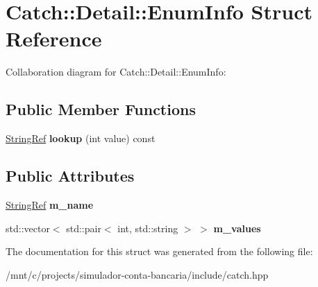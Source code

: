 \hypertarget{structCatch_1_1Detail_1_1EnumInfo}{}\section{Catch\+:\+:Detail\+:\+:Enum\+Info Struct Reference}
\label{structCatch_1_1Detail_1_1EnumInfo}


Collaboration diagram for Catch\+:\+:Detail\+:\+:Enum\+Info\+:
\subsection*{Public Member Functions}
\begin{DoxyCompactItemize}
\item 
\mbox{\label{structCatch_1_1Detail_1_1EnumInfo_a2fdfacc411d7afb1cb690366e5e49cb3}} 
\hyperlink{classCatch_1_1StringRef}{String\+Ref} {\bfseries lookup} (int value) const
\end{DoxyCompactItemize}
\subsection*{Public Attributes}
\begin{DoxyCompactItemize}
\item 
\mbox{\label{structCatch_1_1Detail_1_1EnumInfo_a16ecfd3a7e11439433aabbdf6ecb676c}} 
\hyperlink{classCatch_1_1StringRef}{String\+Ref} {\bfseries m\+\_\+name}
\item 
\mbox{\label{structCatch_1_1Detail_1_1EnumInfo_a1093082858366071bae0eba1fb3c3388}} 
std\+::vector$<$ std\+::pair$<$ int, std\+::string $>$ $>$ {\bfseries m\+\_\+values}
\end{DoxyCompactItemize}


The documentation for this struct was generated from the following file\+:\begin{DoxyCompactItemize}
\item 
/mnt/c/projects/simulador-\/conta-\/bancaria/include/catch.\+hpp\end{DoxyCompactItemize}
